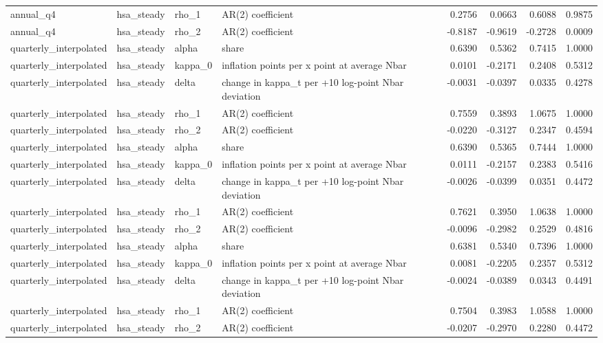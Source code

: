 \begin{tabular}{llllrrrr}
annual\_q4 & hsa\_steady & rho\_1 & AR(2) coefficient & 0.2756 & 0.0663 & 0.6088 & 0.9875 \\
annual\_q4 & hsa\_steady & rho\_2 & AR(2) coefficient & -0.8187 & -0.9619 & -0.2728 & 0.0009 \\
quarterly\_interpolated & hsa\_steady & alpha & share & 0.6390 & 0.5362 & 0.7415 & 1.0000 \\
quarterly\_interpolated & hsa\_steady & kappa\_0 & inflation points per x point at average Nbar & 0.0101 & -0.2171 & 0.2408 & 0.5312 \\
quarterly\_interpolated & hsa\_steady & delta & change in kappa\_t per +10 log-point Nbar deviation & -0.0031 & -0.0397 & 0.0335 & 0.4278 \\
quarterly\_interpolated & hsa\_steady & rho\_1 & AR(2) coefficient & 0.7559 & 0.3893 & 1.0675 & 1.0000 \\
quarterly\_interpolated & hsa\_steady & rho\_2 & AR(2) coefficient & -0.0220 & -0.3127 & 0.2347 & 0.4594 \\
quarterly\_interpolated & hsa\_steady & alpha & share & 0.6390 & 0.5365 & 0.7444 & 1.0000 \\
quarterly\_interpolated & hsa\_steady & kappa\_0 & inflation points per x point at average Nbar & 0.0111 & -0.2157 & 0.2383 & 0.5416 \\
quarterly\_interpolated & hsa\_steady & delta & change in kappa\_t per +10 log-point Nbar deviation & -0.0026 & -0.0399 & 0.0351 & 0.4472 \\
quarterly\_interpolated & hsa\_steady & rho\_1 & AR(2) coefficient & 0.7621 & 0.3950 & 1.0638 & 1.0000 \\
quarterly\_interpolated & hsa\_steady & rho\_2 & AR(2) coefficient & -0.0096 & -0.2982 & 0.2529 & 0.4816 \\
quarterly\_interpolated & hsa\_steady & alpha & share & 0.6381 & 0.5340 & 0.7396 & 1.0000 \\
quarterly\_interpolated & hsa\_steady & kappa\_0 & inflation points per x point at average Nbar & 0.0081 & -0.2205 & 0.2357 & 0.5312 \\
quarterly\_interpolated & hsa\_steady & delta & change in kappa\_t per +10 log-point Nbar deviation & -0.0024 & -0.0389 & 0.0343 & 0.4491 \\
quarterly\_interpolated & hsa\_steady & rho\_1 & AR(2) coefficient & 0.7504 & 0.3983 & 1.0588 & 1.0000 \\
quarterly\_interpolated & hsa\_steady & rho\_2 & AR(2) coefficient & -0.0207 & -0.2970 & 0.2280 & 0.4472 \\

\end{tabular}

